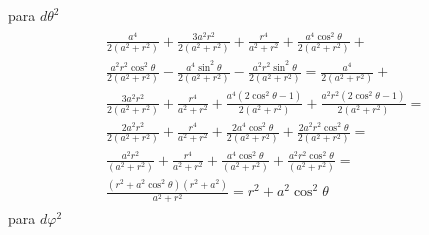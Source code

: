 para   $ d \theta^2$
\begin{align}
    \begin{aligned}
         & \frac{a^4}{2\left(a^2+r^2\right)}+\frac{3 a^2 r^2}{2\left(a^2+r^2\right)}+\frac{r^4}{a^2+r^2}+\frac{a^4 \cos ^2 \theta}{2\left(a^2+r^2\right)}+                                                    \\
         & \frac{a^2 r^2 \cos ^2 \theta}{2\left(a^2+r^2\right)}-\frac{a^4 \sin ^2 \theta}{2\left(a^2+r^2\right)}-\frac{a^2 r^2 \sin ^2 \theta}{2\left(a^2+r^2\right)}=\frac{a^4}{2\left(a^2+r^2\right)}+      \\
         & \frac{3 a^2 r^2}{2\left(a^2+r^2\right)}+\frac{r^4}{a^2+r^2}+\frac{a^4\left(2 \cos ^2 \theta-1\right)}{2\left(a^2+r^2\right)}+\frac{a^2 r^2\left(2 \cos ^2 \theta-1\right)}{2\left(a^2+r^2\right)}= \\
         & \frac{2 a^2 r^2}{2\left(a^2+r^2\right)}+\frac{r^4}{a^2+r^2}+\frac{2 a^4 \cos ^2 \theta}{2\left(a^2+r^2\right)}+\frac{2 a^2 r^2 \cos ^2 \theta}{2\left(a^2+r^2\right)}=                             \\
         & \frac{a^2 r^2}{\left(a^2+r^2\right)}+\frac{r^4}{a^2+r^2}+\frac{a^4 \cos ^2 \theta}{\left(a^2+r^2\right)}+\frac{a^2 r^2 \cos ^2 \theta}{\left(a^2+r^2\right)}=                                      \\
         & \frac{\left(r^2+a^2 \cos ^2 \theta\right)\left(r^2+a^2\right)}{a^2+r^2}=   r^2+a^2 \cos ^2 \theta
    \end{aligned}
\end{align}
para $ d \varphi^2$
